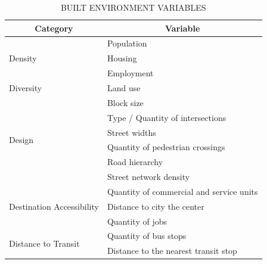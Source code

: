 \begin{table}[!hbtp]
    \footnotesize
    \captionsetup{justification=raggedright,
        singlelinecheck=false,
        font=footnotesize}
    \caption{BUILT ENVIRONMENT VARIABLES}
    \centering
    \begin{tabular}{ll}
        \hline
        \multicolumn{1}{c}{\textbf{Category}}                          & \multicolumn{1}{c}{\textbf{Variable}}                        \\ \hline
        \multirow{3}{*}{Density}                   & Population                               \\
                                                   & Housing                                  \\
                                                   & Employment                               \\ \hline
        \multirow{1}{*}{Diversity}                 & Land use                                 \\
                                                   \hline
        \multirow{6}{*}{Design}                    & Block size                               \\
                                                   & Type / Quantity of intersections                \\
                                                   & Street widths                            \\
                                                   & Quantity of pedestrian crossings         \\
                                                   & Road hierarchy \\
                                                   & Street network density \\
                                                    \hline
        \multirow{3}{*}{Destination Accessibility} & Quantity of commercial and service units \\
                                                   & Distance to city the center                  \\
                                                   & Quantity of jobs                         \\ \hline
        \multirow{2}{*}{Distance to Transit}       & Quantity of bus stops                    \\
                                                   & Distance to the nearest transit stop         \\

\end{tabular}
\end{table}
